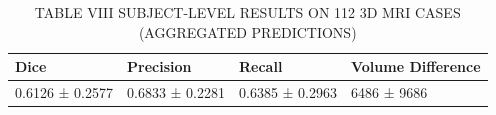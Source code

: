 \begin{table}[htbp]
\centering
\caption{TABLE VIII SUBJECT-LEVEL RESULTS ON 112 3D MRI CASES (AGGREGATED PREDICTIONS)}
\label{tab:table\_008}
\begin{tabular}{llll}
\hline
Dice & Precision & Recall & Volume Difference \\
\hline
0.6126 ± 0.2577 & 0.6833 ± 0.2281 & 0.6385 ± 0.2963 & 6486 ± 9686 \\
\hline
\end{tabular}
\end{table}
